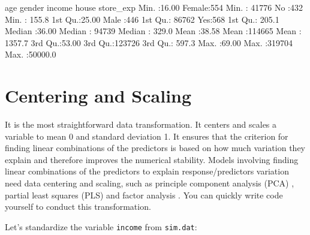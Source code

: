 \documentclass[
  12pt,
]{krantz}
\makeatletter
\newenvironment{Shaded}{\begin{snugshade}}{\end{snugshade}}
\newcommand{\AttributeTok}[1]{\textcolor[rgb]{0.61,0.61,0.61}{#1}}
\newcommand{\CommentTok}[1]{\textcolor[rgb]{0.37,0.37,0.37}{\textit{#1}}}
\newcommand{\FunctionTok}[1]{\textcolor[rgb]{0,0,0}{#1}}
\newcommand{\NormalTok}[1]{#1}
\newcommand{\OtherTok}[1]{\textcolor[rgb]{0.37,0.37,0.37}{#1}}
\newcommand{\SpecialCharTok}[1]{\textcolor[rgb]{0,0,0}{#1}}
\newenvironment{kframe}{%
\medskip{}
\setlength{\fboxsep}{.8em}
 \def\at@end@of@kframe{}%
 \ifinner\ifhmode%
  \def\at@end@of@kframe{\end{minipage}}%
  \begin{minipage}{\columnwidth}%
 \fi\fi%
 \def\FrameCommand##1{\hskip\@totalleftmargin \hskip-\fboxsep
 \colorbox{shadecolor}{##1}\hskip-\fboxsep
     \hskip-\linewidth \hskip-\@totalleftmargin \hskip\columnwidth}%
 \MakeFramed {\advance\hsize-\width
   \@totalleftmargin\z@ \linewidth\hsize
   \@setminipage}}%
 {\par\unskip\endMakeFramed%
 \at@end@of@kframe}
\renewenvironment{Shaded}{\begin{kframe}}{\end{kframe}}
\makeatother
\begin{document}
\begin{Shaded}
\begin{Highlighting}[]
\NormalTok{      age           gender        income       house       store\_exp      }
\NormalTok{ Min.   :16.00   Female:554   Min.   : 41776   No :432   Min.   :  155.8  }
\NormalTok{ 1st Qu.:25.00   Male  :446   1st Qu.: 86762   Yes:568   1st Qu.:  205.1  }
\NormalTok{ Median :36.00                Median : 94739             Median :  329.0  }
\NormalTok{ Mean   :38.58                Mean   :114665             Mean   : 1357.7  }
\NormalTok{ 3rd Qu.:53.00                3rd Qu.:123726             3rd Qu.:  597.3  }
\NormalTok{ Max.   :69.00                Max.   :319704             Max.   :50000.0  }
\end{Highlighting}
\end{Shaded}

\hypertarget{centering-and-scaling}{%
\section{Centering and Scaling}\label{centering-and-scaling}}

It is the most straightforward data transformation. It centers and scales a variable to mean 0 and standard deviation 1. It ensures that the criterion for finding linear combinations of the predictors is based on how much variation they explain and therefore improves the numerical stability. Models involving finding linear combinations of the predictors to explain response/predictors variation need data centering and scaling, such as principle component analysis (PCA) \citep{pca1}, partial least squares (PLS) \citep{PLS1} and factor analysis \citep{EFA1}. You can quickly write code yourself to conduct this transformation.

Let's standardize the variable \texttt{income} from \texttt{sim.dat}:

\begin{Shaded}
\end{Shaded}
\end{document}
